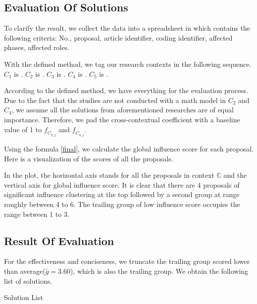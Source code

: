 \subsection{Evaluation Of Solutions}
To clarify the result, we collect the data into a spreadsheet in which contains the following criteria: No., proposal, article identifier, coding identifier, affected phases, affected roles.

With the defined method, we tag our research contexts in the following sequence.
$C_{1}$ is .
$C_{2}$ is .
$C_{3}$ is .
$C_{4}$ is .
$C_{5}$ is .

According to the defined method, we have everything for the evaluation process. Due to the fact that the studies are not conducted with a math model in $C_{2}$ and $C_{4}$, we assume all the solutions from aforementioned researches are of equal importance. Therefore, we pad the cross-contextual coefficient with a baseline value of 1 to $\mathit{f_{C_{2,j}}}$ and $\mathit{f_{C_{4,j}}}$.

Using the formula \ref{final}, we calculate the global influence score for each proposal. Here is a visualization of the scores of all the proposals.

\begin{figure}[ht]
\centering
{}
\end{figure}

In the plot, the horizontal axis stands for all the proposals in context $\mathbb{C}$ and the vertical axis for global influence score. It is clear that there are 4 proposals of significant influence clustering at the top followed by a second group at range roughly between 4 to 6. The trailing group of low influence score occupies the range between 1 to 3.

\subsection{Result Of Evaluation}
For the effectiveness and conciseness, we truncate the trailing group scored lower than average($\bar{g}=3.60$), which is also the trailing group. We obtain the following list of solutions.

\begin{table}[ht]
\caption{Solution List}
\label{tab:solution}
\end{table}

